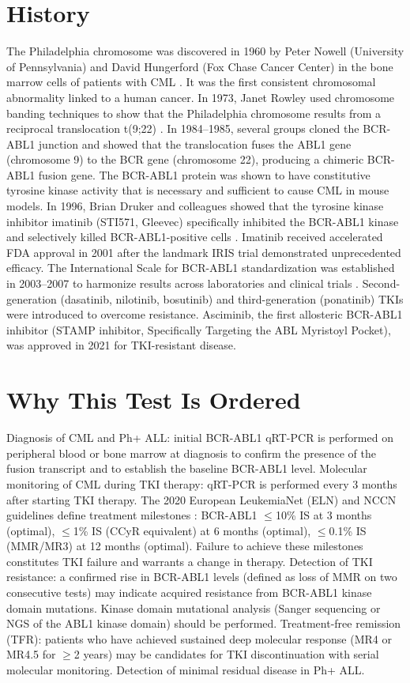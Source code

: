 \section*{History}
The Philadelphia chromosome was discovered in 1960 by Peter Nowell (University of Pennsylvania) and David Hungerford (Fox Chase Cancer Center) in the bone marrow cells of patients with CML \cite{nowell1960minute}. It was the first consistent chromosomal abnormality linked to a human cancer. In 1973, Janet Rowley used chromosome banding techniques to show that the Philadelphia chromosome results from a reciprocal translocation t(9;22) \cite{rowley1973consistent}. In 1984--1985, several groups cloned the BCR-ABL1 junction and showed that the translocation fuses the ABL1 gene (chromosome 9) to the BCR gene (chromosome 22), producing a chimeric BCR-ABL1 fusion gene. The BCR-ABL1 protein was shown to have constitutive tyrosine kinase activity that is necessary and sufficient to cause CML in mouse models. In 1996, Brian Druker and colleagues showed that the tyrosine kinase inhibitor imatinib (STI571, Gleevec) specifically inhibited the BCR-ABL1 kinase and selectively killed BCR-ABL1-positive cells \cite{druker1996effects}. Imatinib received accelerated FDA approval in 2001 after the landmark IRIS trial demonstrated unprecedented efficacy. The International Scale for BCR-ABL1 standardization was established in 2003--2007 to harmonize results across laboratories and clinical trials \cite{branford2008desirable}. Second-generation (dasatinib, nilotinib, bosutinib) and third-generation (ponatinib) TKIs were introduced to overcome resistance. Asciminib, the first allosteric BCR-ABL1 inhibitor (STAMP inhibitor, Specifically Targeting the ABL Myristoyl Pocket), was approved in 2021 for TKI-resistant disease.

\section*{Why This Test Is Ordered}
Diagnosis of CML and Ph+ ALL: initial BCR-ABL1 qRT-PCR is performed on peripheral blood or bone marrow at diagnosis to confirm the presence of the fusion transcript and to establish the baseline BCR-ABL1 level. Molecular monitoring of CML during TKI therapy: qRT-PCR is performed every 3 months after starting TKI therapy. The 2020 European LeukemiaNet (ELN) and NCCN guidelines define treatment milestones \cite{hochhaus2020european}: BCR-ABL1 $\leq$10\% IS at 3 months (optimal), $\leq$1\% IS (CCyR equivalent) at 6 months (optimal), $\leq$0.1\% IS (MMR/MR3) at 12 months (optimal). Failure to achieve these milestones constitutes TKI failure and warrants a change in therapy. Detection of TKI resistance: a confirmed rise in BCR-ABL1 levels (defined as loss of MMR on two consecutive tests) may indicate acquired resistance from BCR-ABL1 kinase domain mutations. Kinase domain mutational analysis (Sanger sequencing or NGS of the ABL1 kinase domain) should be performed. Treatment-free remission (TFR): patients who have achieved sustained deep molecular response (MR4 or MR4.5 for $\geq$2 years) may be candidates for TKI discontinuation with serial molecular monitoring. Detection of minimal residual disease in Ph+ ALL.

